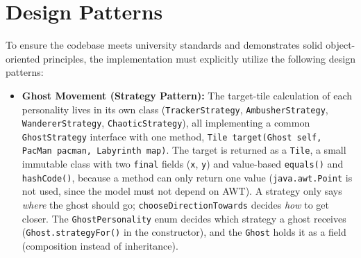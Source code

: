 \documentclass[11pt, a4paper]{article}
\begin{document}
\clearpage

\section{Design Patterns}
\label{sec:design_patterns}
To ensure the codebase meets university standards and demonstrates solid object-oriented principles, the implementation must explicitly utilize the following design patterns:

\begin{itemize}
    \item \textbf{Ghost Movement (Strategy Pattern):} The target-tile calculation of each personality lives in its own class (\texttt{TrackerStrategy}, \texttt{AmbusherStrategy}, \texttt{WandererStrategy}, \texttt{ChaoticStrategy}), all implementing a common \texttt{GhostStrategy} interface with one method, \texttt{Tile target(Ghost self, PacMan pacman, Labyrinth map)}. The target is returned as a \texttt{Tile}, a small immutable class with two \texttt{final} fields (\texttt{x}, \texttt{y}) and value-based \texttt{equals()} and \texttt{hashCode()}, because a method can only return one value (\texttt{java.awt.Point} is not used, since the model must not depend on AWT). A strategy only says \textit{where} the ghost should go; \texttt{chooseDirectionTowards} decides \textit{how} to get closer. The \texttt{GhostPersonality} enum decides which strategy a ghost receives (\texttt{Ghost.strategyFor()} in the constructor), and the \texttt{Ghost} holds it as a field (composition instead of inheritance).


\end{itemize}
\end{document}
